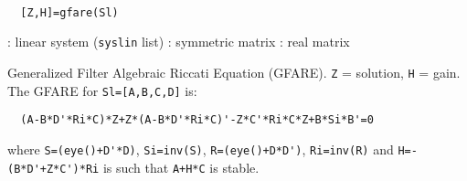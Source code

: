 \begin{mandesc}
   \\ %
\end{mandesc}
\begin{calling_sequence}
\begin{verbatim}
  [Z,H]=gfare(Sl)  
\end{verbatim}
\end{calling_sequence}
\begin{parameters}
  \begin{varlist}
    : linear system (\verb!syslin! list)
    : symmetric matrix
    : real matrix
  \end{varlist}
\end{parameters}
\begin{mandescription}
  Generalized Filter Algebraic Riccati Equation (GFARE).
  \verb!Z! = solution, \verb!H! = gain.
  The GFARE for \verb!Sl=[A,B,C,D]! is:
\begin{verbatim}
  (A-B*D'*Ri*C)*Z+Z*(A-B*D'*Ri*C)'-Z*C'*Ri*C*Z+B*Si*B'=0
\end{verbatim}
where \verb!S=(eye()+D'*D)!, \verb!Si=inv(S)!, \verb!R=(eye()+D*D')!, \verb!Ri=inv(R)!
and \verb!H=-(B*D'+Z*C')*Ri! is such that \verb!A+H*C! is stable.
\end{mandescription}
\begin{manseealso}
\end{manseealso}
